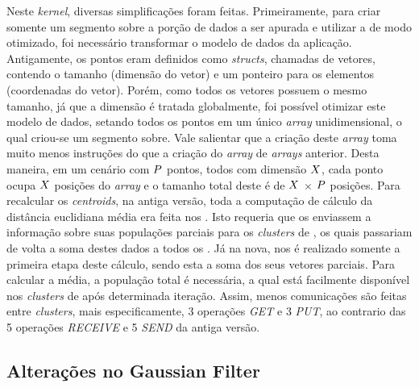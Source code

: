\documentclass[a4paper,11pt]{article}
\begin{document}
Neste \textit{kernel}, diversas simplificações foram feitas. Primeiramente, para criar somente um segmento sobre a porção de dados a ser apurada e utilizar a \async de modo otimizado, foi necessário transformar o modelo de dados da aplicação. Antigamente, os pontos eram definidos como \textit{structs}, chamadas de vetores, contendo o tamanho (dimensão do vetor) e um ponteiro para os elementos (coordenadas do vetor). Porém, como todos os vetores possuem o mesmo tamanho, já que a dimensão é tratada globalmente, foi possível otimizar este modelo de dados, setando todos os pontos em um único \textit{array} unidimensional, o qual criou-se um segmento sobre. Vale salientar que a criação deste \textit{array} toma muito menos instruções do que a criação do \textit{array} de \textit{arrays} anterior. Desta maneira, em um cenário com $\mathnormal{P}$ pontos, todos com dimensão $\mathnormal{X}$, cada ponto ocupa $\mathnormal{X}$ posições do \textit{array} e o tamanho total deste é de $\mathnormal{X}$ $\times$ $\mathnormal{P}$ posições. Para recalcular os \textit{centroids}, na antiga versão, toda a computação de cálculo da distância euclidiana média era feita nos \ccs. Isto requeria que os \ccs enviassem a informação sobre suas populações parciais para os \textit{clusters} de \io, os quais passariam de volta a soma destes dados a todos os \ccs. Já na nova, nos \ccs é realizado somente a primeira etapa deste cálculo, sendo esta a soma dos seus vetores parciais. Para calcular a média, a população total é necessária, a qual está facilmente disponível nos \textit{clusters} de \io após determinada iteração. Assim, menos comunicações são feitas entre \textit{clusters}, mais especificamente, 3 operações \textit{GET} e 3 \textit{PUT}, ao contrario das 5 operações \textit{RECEIVE} e 5 \textit{SEND} da antiga versão.

\subsection{Alterações no Gaussian Filter}
\end{document}

